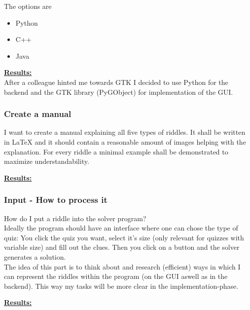 \documentclass{article}
\begin{document}
	The options are
	\begin{itemize}
		\item Python
		\item C++
		\item Java
	\end{itemize}

	\begin{framed}
		\textbf{\underline{Results:}}\\
		After a colleague hinted me towards GTK I decided to use Python for the backend and the GTK library (PyGObject) for implementation of the GUI.
	\end{framed}

	\subsubsection*{Create a manual}
	
	I want to create a manual explaining all five types of riddles. It shall be written in LaTeX and it should contain a reasonable amount of images helping with the explanation. For every riddle a minimal example shall be demonstrated to maximize understandability.
	
	\begin{framed}
	\textbf{\underline{Results:}}\\
	\end{framed}
	
	\subsubsection*{Input - How to process it}
	
	How do I put a riddle into the solver program? \\
	Ideally the program should have an interface where one can chose the type of quiz: You click the quiz you want, select it's size (only relevant for quizzes with variable size) and fill out the clues. Then you click on a button and the solver generates a solution. \\
	
	The idea of this part is to think about and research (efficient) ways in which I can represent the riddles within the program (on the GUI aswell as in the backend). This way my tasks will be more clear in the implementation-phase.
	
	\begin{framed}
		\textbf{\underline{Results:}}\\
	\end{framed}
	
\end{document}

